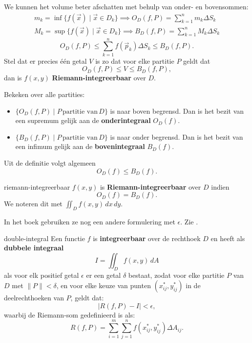 \documentclass[
    10pt,
    a4paper,
    twoside,
]{article}
\begin{document}
We kunnen het volume beter afschatten met behulp van onder- en bovensommen:
\begin{align*}
    m_k = \inf\{f(\vec{x}) \mid \vec{x} \in D_k\} \implies O_D(f,P) = \sum_{k=1}^{n} m_k \Delta S_k \\
    M_k = \sup\{f(\vec{x}) \mid \vec{x} \in D_k\} \implies B_D(f,P) = \sum_{k=1}^{n} M_k \Delta S_k
\end{align*}
\[
    O_D(f,P) \leq \sum_{k=1}^{n} f(\vec{p}_k) \Delta S_k \leq B_D(f,P).
\]
Stel dat er precies één getal $V$ is zo dat voor elke partitie $P$ geldt dat
\[
    O_D(f,P) \leq V \leq B_D(f,P),
\] dan is $f(x,y)$ \textbf{Riemann-integreerbaar} over $D$.

Bekeken over alle partities:
\begin{itemize}
    \item $\{O_D(f,P) \mid P\, \text{partitie van}\, D\}$ is naar boven begrensd.
        Dan is het bezit van een supremum gelijk aan de \textbf{onderintegraal} $O_D(f)$.
    \item $\{B_D(f,P) \mid P\, \text{partitie van}\, D\}$ is naar onder begrensd.
        Dan is het bezit van een infimum gelijk aan de \textbf{bovenintegraal} $B_D(f)$.
\end{itemize}
Uit de definitie volgt algemeen
\[
    O_D(f) \leq B_D(f).
\]

\begin{definitie}{}{riemann-integreerbaar}
    $f(x,y)$ is \textbf{Riemann-integreerbaar} over $D$ indien
    \[
        O_D(f) = B_D(f).
    \]
    We noteren dit met $\displaystyle \iint_D f(x,y)\,dx\,dy$.
\end{definitie}

\begin{opmerking}{}
    In het boek gebruiken ze nog een andere formulering met $\epsilon$. Zie .
\end{opmerking}

\begin{definitie}{\cite[835]{cursus}}{double-integral}
    Een functie $f$ is \textbf{integreerbaar} over de rechthoek $D$ en heeft als \textbf{dubbele integraal}
    \[
        I = \iint_D f(x,y)\,dA
    \]
    als voor elk positief getal $\epsilon$ er een getal $\delta$ bestaat, zodat voor elke partitie $P$ van $D$ met $\lVert P\rVert < \delta$, en voor elke keuze van punten $(x_{ij}^*, y_{ij}^*)$ in de deelrechthoeken van $P$, geldt dat:
    \[
        \lvert R(f,P) - I\rvert < \epsilon,
    \]
    waarbij de Riemann-som gedefinieerd is als:
    \[
        R(f,P) = \sum_{i=1}^m \sum_{j=1}^n f(x_{ij}^*, y_{ij}^*) \Delta A_{ij}.
    \]
\end{definitie}

\printbibliography
\end{document}
